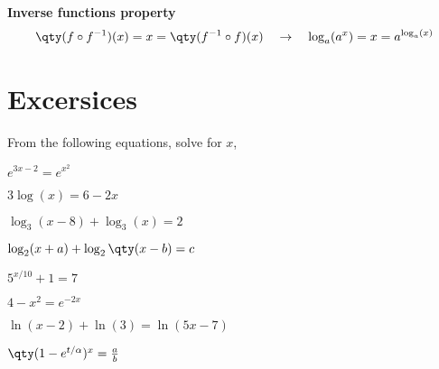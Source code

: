 \documentclass[../main.tex]{subfiles}
\begin{document}
\begin{minipage}[c]{\textwidth}
    \centering
    {\bfseries\large Inverse functions property}
    \begin{gather*}
        \qty(f\circ f^{-1})(x) = x = \qty(f^{-1}\circ f)(x)
        \quad\rightarrow\quad
        \log_a(a^x) = x = a^{\log_a(x)}
    \end{gather*}
\end{minipage}

\section{Excersices}

From the following equations, solve for $x$,
\begin{enumerate}
    \begin{minipage}[c]{0.45\textwidth}
        \item $ e^{3x-2} = e^{x^2} $
        \item $ 3\log(x) = 6 -2x $
        \item $ \log_3(x-8) + \log_3(x) = 2 $
        \item $ \log_2(x+a) + \log_2\qty(x-b) = c $
    \end{minipage}
    \begin{minipage}[c]{0.45\textwidth}
        \item $ 5^{x/10}+1 = 7 $
        \item $ 4-x^2 = e^{-2x} $
        \item $ \ln(x-2) + \ln(3) = \ln(5x-7) $
        \item $\qty(1-e^{t/\alpha})^{x} = \frac{a}{b} $
    \end{minipage}
\end{enumerate}
\end{document}
